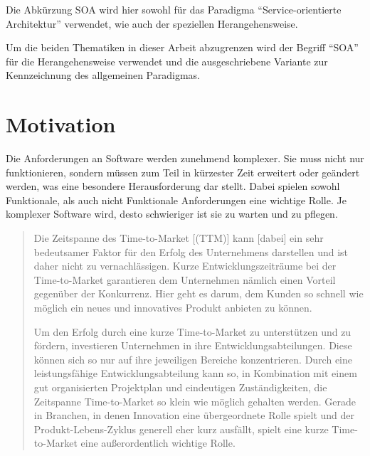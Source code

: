 Die Abkürzung SOA wird hier sowohl für das Paradigma "`Service-orientierte Architektur"' verwendet, wie auch der speziellen Herangehensweise.

Um die beiden Thematiken in dieser Arbeit abzugrenzen wird der Begriff "`SOA"' für die Herangehensweise verwendet und die ausgeschriebene Variante zur Kennzeichnung des allgemeinen Paradigmas.



\section{Motivation}
\label{sec:motivation}
Die Anforderungen an Software werden zunehmend komplexer. Sie muss nicht nur funktionieren, sondern müssen zum Teil in kürzester Zeit erweitert oder geändert werden, was eine besondere Herausforderung dar stellt. Dabei spielen sowohl Funktionale, als auch nicht Funktionale Anforderungen eine wichtige Rolle. Je komplexer Software wird, desto schwieriger ist sie zu warten und zu pflegen. 

\begin{quotation}
\frqq Die Zeitspanne des Time-to-Market [(TTM)] kann [dabei] ein sehr bedeutsamer Faktor für den Erfolg des Unternehmens darstellen und ist daher nicht zu vernachlässigen. Kurze Entwicklungszeiträume bei der Time-to-Market garantieren dem Unternehmen nämlich einen Vorteil gegenüber der Konkurrenz. Hier geht es darum, dem Kunden so schnell wie möglich ein neues und innovatives Produkt anbieten zu können.
    
Um den Erfolg durch eine kurze Time-to-Market zu unterstützen und zu fördern, investieren Unternehmen in ihre Entwicklungsabteilungen. Diese können sich so nur auf ihre jeweiligen Bereiche konzentrieren. Durch eine leistungsfähige Entwicklungsabteilung kann so, in Kombination mit einem gut organisierten Projektplan und eindeutigen Zuständigkeiten, die Zeitspanne Time-to-Market so klein wie möglich gehalten werden. Gerade in Branchen, in denen Innovation eine übergeordnete Rolle spielt und der Produkt-Lebens-Zyklus generell eher kurz ausfällt, spielt eine kurze Time-to-Market eine außerordentlich wichtige Rolle.\flqq \cite{ttm}
\end{quotation}

